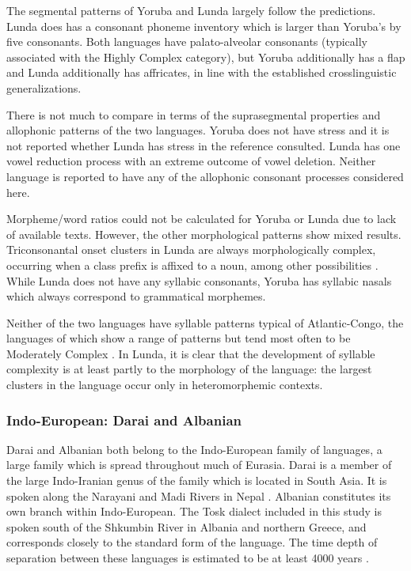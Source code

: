   The segmental patterns of Yoruba and Lunda largely follow the predictions. Lunda does has a consonant phoneme inventory which is larger than Yoruba’s by five consonants. Both languages have palato-alveolar consonants (typically associated with the Highly Complex category), but Yoruba additionally has a flap and Lunda additionally has affricates, in line with the established crosslinguistic generalizations.

  There is not much to compare in terms of the suprasegmental properties and allophonic patterns of the two languages. Yoruba does not have stress and it is not reported whether Lunda has stress in the reference consulted. Lunda has one vowel reduction process with an extreme outcome of vowel deletion. Neither language is reported to have any of the allophonic consonant processes considered here.

  Morpheme/word ratios could not be calculated for Yoruba or Lunda due to lack of available texts. However, the other morphological patterns show mixed results. Triconsonantal onset clusters in Lunda are always morphologically complex, occurring when a class prefix is affixed to a noun, among other possibilities \citep[23-24]{Kawasha2003}. While Lunda does not have any syllabic consonants, Yoruba has syllabic nasals which always correspond to grammatical morphemes.

  Neither of the two languages have syllable patterns typical of Atlantic-Congo, the languages of which show a range of patterns but tend most often to be Moderately Complex \citep{Maddieson2013a}. In Lunda, it is clear that the development of syllable complexity is at least partly to the morphology of the language: the largest clusters in the language occur only in heteromorphemic contexts.

\subsubsection{{Indo-European:} {Darai} {and} {Albanian}}\label{sec:8.4.3.5}

  Darai and Albanian both belong to the Indo-European family of languages, a large family which is spread throughout much of Eurasia. Darai is a member of the large Indo-Iranian genus of the family which is located in South Asia. It is spoken along the Narayani and Madi Rivers in Nepal \citep{Dhakal2012}. Albanian constitutes its own branch within Indo-European. The Tosk dialect included in this study is spoken south of the Shkumbin River in Albania and northern Greece, and corresponds closely to the standard form of the language. The time depth of separation between these languages is estimated to be at least 4000 years \citep[146]{Garrett2006}.

